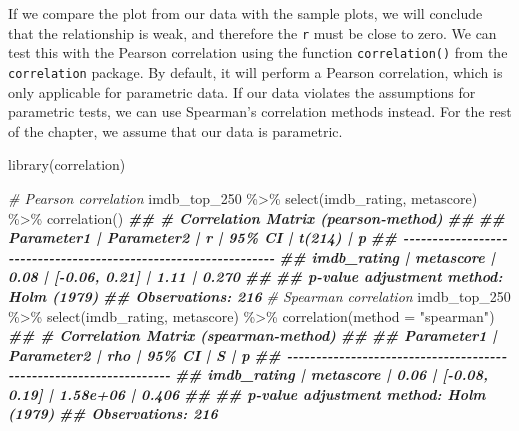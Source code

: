 \documentclass[
]{book}
\newenvironment{Shaded}{\begin{snugshade}}{\end{snugshade}}
\newcommand{\AttributeTok}[1]{\textcolor[rgb]{0.77,0.63,0.00}{#1}}
\newcommand{\CommentTok}[1]{\textcolor[rgb]{0.56,0.35,0.01}{\textit{#1}}}
\newcommand{\DocumentationTok}[1]{\textcolor[rgb]{0.56,0.35,0.01}{\textbf{\textit{#1}}}}
\newcommand{\FunctionTok}[1]{\textcolor[rgb]{0.00,0.00,0.00}{#1}}
\newcommand{\NormalTok}[1]{#1}
\newcommand{\SpecialCharTok}[1]{\textcolor[rgb]{0.00,0.00,0.00}{#1}}
\newcommand{\StringTok}[1]{\textcolor[rgb]{0.31,0.60,0.02}{#1}}
\begin{document}
If we compare the plot from our data with the sample plots, we will conclude that the relationship is weak, and therefore the \texttt{r} must be close to zero. We can test this with the Pearson correlation using the function \texttt{correlation()} from the \texttt{correlation} package. By default, it will perform a Pearson correlation, which is only applicable for parametric data. If our data violates the assumptions for parametric tests, we can use Spearman's correlation methods instead. For the rest of the chapter, we assume that our data is parametric.

\begin{Shaded}
\begin{Highlighting}[]
\FunctionTok{library}\NormalTok{(correlation)}

\CommentTok{\# Pearson correlation}
\NormalTok{imdb\_top\_250 }\SpecialCharTok{\%\textgreater{}\%}
  \FunctionTok{select}\NormalTok{(imdb\_rating, metascore) }\SpecialCharTok{\%\textgreater{}\%}
  \FunctionTok{correlation}\NormalTok{()}
\DocumentationTok{\#\# \# Correlation Matrix (pearson{-}method)}
\DocumentationTok{\#\# }
\DocumentationTok{\#\# Parameter1  | Parameter2 |    r |        95\% CI | t(214) |     p}
\DocumentationTok{\#\# {-}{-}{-}{-}{-}{-}{-}{-}{-}{-}{-}{-}{-}{-}{-}{-}{-}{-}{-}{-}{-}{-}{-}{-}{-}{-}{-}{-}{-}{-}{-}{-}{-}{-}{-}{-}{-}{-}{-}{-}{-}{-}{-}{-}{-}{-}{-}{-}{-}{-}{-}{-}{-}{-}{-}{-}{-}{-}{-}{-}{-}{-}{-}{-}}
\DocumentationTok{\#\# imdb\_rating |  metascore | 0.08 | [{-}0.06, 0.21] |   1.11 | 0.270}
\DocumentationTok{\#\# }
\DocumentationTok{\#\# p{-}value adjustment method: Holm (1979)}
\DocumentationTok{\#\# Observations: 216}
\CommentTok{\# Spearman correlation}
\NormalTok{imdb\_top\_250 }\SpecialCharTok{\%\textgreater{}\%}
  \FunctionTok{select}\NormalTok{(imdb\_rating, metascore) }\SpecialCharTok{\%\textgreater{}\%}
  \FunctionTok{correlation}\NormalTok{(}\AttributeTok{method =} \StringTok{"spearman"}\NormalTok{)}
\DocumentationTok{\#\# \# Correlation Matrix (spearman{-}method)}
\DocumentationTok{\#\# }
\DocumentationTok{\#\# Parameter1  | Parameter2 |  rho |        95\% CI |        S |     p}
\DocumentationTok{\#\# {-}{-}{-}{-}{-}{-}{-}{-}{-}{-}{-}{-}{-}{-}{-}{-}{-}{-}{-}{-}{-}{-}{-}{-}{-}{-}{-}{-}{-}{-}{-}{-}{-}{-}{-}{-}{-}{-}{-}{-}{-}{-}{-}{-}{-}{-}{-}{-}{-}{-}{-}{-}{-}{-}{-}{-}{-}{-}{-}{-}{-}{-}{-}{-}{-}{-}}
\DocumentationTok{\#\# imdb\_rating |  metascore | 0.06 | [{-}0.08, 0.19] | 1.58e+06 | 0.406}
\DocumentationTok{\#\# }
\DocumentationTok{\#\# p{-}value adjustment method: Holm (1979)}
\DocumentationTok{\#\# Observations: 216}
\end{Highlighting}
\end{Shaded}
\end{document}
